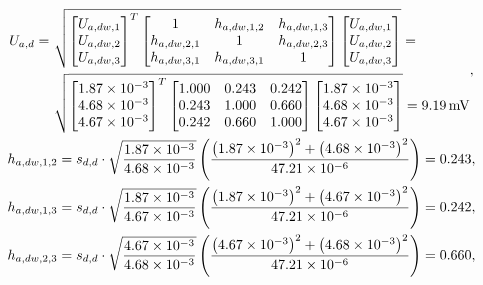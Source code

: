 \begin{gather}
\begin{split}
U_{a,d} = ~ & \sqrt{
\begin{bmatrix}
U_{a,dw,1} \\ U_{a,dw,2} \\ U_{a,dw,3}
\end{bmatrix}^{T}
\begin{bmatrix}
1            & h_{a,dw,1,2} & h_{a,dw,1,3} \\
h_{a,dw,2,1} & 1            & h_{a,dw,2,3} \\
h_{a,dw,3,1} & h_{a,dw,3,1} & 1                 \\
\end{bmatrix}
\begin{bmatrix}
U_{a,dw,1} \\ U_{a,dw,2} \\ U_{a,dw,3}
\end{bmatrix}} = ~ \\ & \sqrt{
\begin{bmatrix}
\num{1.87e-3} \\ \num{4.68e-3} \\ \num{4.67e-3}
\end{bmatrix}^{T}
\begin{bmatrix}
1.000 & 0.243 & 0.242 \\
0.243 & 1.000 & 0.660 \\
0.242 & 0.660 & 1.000 \\
\end{bmatrix}
\begin{bmatrix}
\num{1.87e-3} \\ \num{4.68e-3} \\ \num{4.67e-3}
\end{bmatrix}} = \qty{9.19}{mV}
\end{split}
\label{eq:sym_parta_uncert_dyn}, \\
h_{a,dw,1,2} = s_{d,d} \cdot \sqrt{\frac{\num{1.87e-3}}{\num{4.68e-3}}} \left( \frac{\emb{\num{1.87e-3}}^{2} + \emb{\num{4.68e-3}}^{2}}{\num{47.21e-6}} \right) = 0.243 \label{eq:sym_parta_coher_dw_1_2}, \\
h_{a,dw,1,3} = s_{d,d} \cdot \sqrt{\frac{\num{1.87e-3}}{\num{4.67e-3}}} \left( \frac{\emb{\num{1.87e-3}}^{2} + \emb{\num{4.67e-3}}^{2}}{\num{47.21e-6}} \right) = 0.242 \label{eq:sym_parta_coher_dw_1_3}, \\
h_{a,dw,2,3} = s_{d,d} \cdot \sqrt{\frac{\num{4.67e-3}}{\num{4.68e-3}}} \left( \frac{\emb{\num{4.67e-3}}^{2} + \emb{\num{4.68e-3}}^{2}}{\num{47.21e-6}} \right) = 0.660 \label{eq:sym_parta_coher_dw_2_3}, \\

\end{gather}
